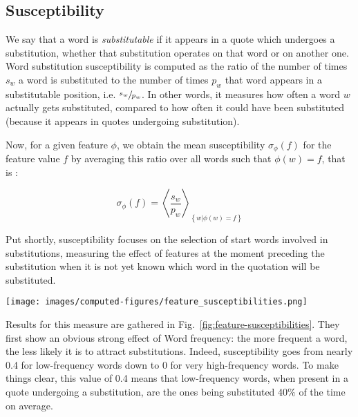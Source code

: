 \subsection{Susceptibility}

We say that a word is \emph{substitutable} if it appears in a quote which undergoes a substitution, whether that substitution operates on that word or on another one.
Word substitution susceptibility is computed as the ratio of the number of times $s_w$ a word is substituted to the number of times $p_w$ that word appears in a substitutable position, \hbox{i.e.} $\sfrac{s_w}{p_w}$. {In other words, it measures how often a word $w$ actually gets substituted, compared to how often it could have been substituted (because it appears in quotes undergoing substitution)}.

Now, for a given feature $\phi$, we obtain the mean susceptibility $\sigma_{\phi}(f)$ for the feature value $f$ by averaging this ratio over all words such that $\phi(w) = f$, that is%
:

$$\sigma_{\phi}(f) = \left< \frac{s_w}{p_w} \right>_{\left\lbrace w | \phi(w) = f \right\rbrace}$$

Put shortly, susceptibility focuses on the selection of start words involved in substitutions, measuring the effect of features at the moment preceding the substitution when it is not yet known which word in the quotation will be substituted.

\begin{figure*}[!th]
    \centering
    \texttt{[image: images/computed-figures/feature\_susceptibilities.png]}
    \caption{\textbf{Substitution susceptibility:} average susceptibility to substitution vs. average feature value of a candidate word for substitution, with 95\% asymptotic confidence intervals.
    The heatmap on the lower-right shows the joint effect of Age of acquisition and Number of phonemes on susceptibility, averaged over the respective single-variable ranges, with sample size (word numbers) in parentheses.
    Without the rather non-significant cells (11 words or less), the heatmap shows no specific trend in one direction or the other.}
    \label{fig:feature-susceptibilities}
\end{figure*}
\medskip
Results for this measure are gathered in Fig.~\ref{fig:feature-susceptibilities}. They first show an obvious strong effect of Word frequency: the more frequent a word, the less likely it is to attract substitutions.
Indeed, susceptibility goes from nearly 0.4 for low-frequency words down to 0 for very high-frequency words.
To make things clear, this value of 0.4 means that low-frequency words, when present in a quote undergoing a substitution, are the ones being substituted 40\% of the time on average.

